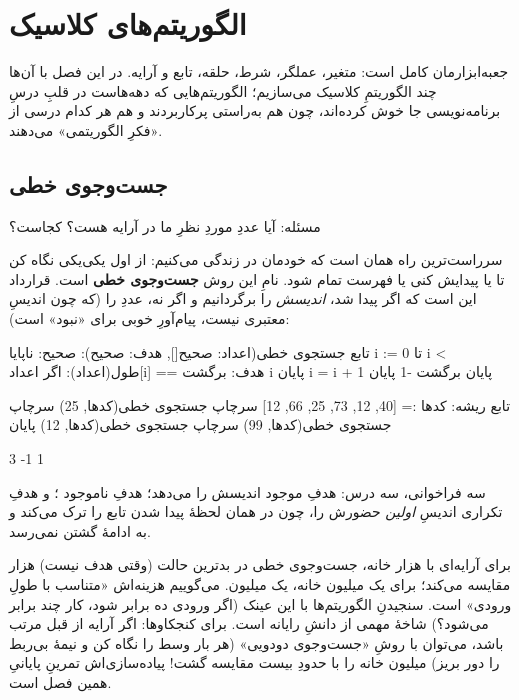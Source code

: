 \chapter{الگوریتم‌های کلاسیک}%
\label{ch:classic-algorithms}

جعبه‌ابزارمان کامل است: متغیر، عملگر، شرط، حلقه، تابع و آرایه. در این فصل
با آن‌ها چند الگوریتمِ کلاسیک می‌سازیم؛ الگوریتم‌هایی که دهه‌هاست در قلبِ
درسِ برنامه‌نویسی جا خوش کرده‌اند، چون هم به‌راستی پرکاربردند و هم هر
کدام درسی از «فکرِ الگوریتمی» می‌دهند.

\section{جست‌وجوی خطی}

مسئله: آیا عددِ موردِ نظرِ ما در آرایه هست؟ کجاست؟

سرراست‌ترین راه همان است که خودمان در زندگی می‌کنیم: از اول یکی‌یکی نگاه
کن تا یا پیدایش کنی یا فهرست تمام شود. نامِ این روش \textbf{جست‌وجوی خطی}
است. قرارداد این است که اگر پیدا شد، \emph{اندیسش} را برگردانیم و اگر نه،
عددِ  را (که چون اندیسِ معتبری نیست، پیام‌آورِ خوبی برای «نبود»
است):

\begin{salamfa}
تابع جستجوی خطی(اعداد: صحیح[], هدف: صحیح): صحیح:
    ناپایا i := 0
    تا i < طول(اعداد):
        اگر اعداد[i] == هدف:
            برگشت i
        پایان
        i = i + 1
    پایان
    برگشت -1
پایان

تابع ریشه:
    کدها := [40, 12, 73, 25, 66, 12]
    سرچاپ جستجوی خطی(کدها, 25)
    سرچاپ جستجوی خطی(کدها, 99)
    سرچاپ جستجوی خطی(کدها, 12)
پایان
\end{salamfa}

\begin{progout}
3
-1
1
\end{progout}

سه فراخوانی، سه درس: هدفِ موجود اندیسش را می‌دهد؛ هدفِ ناموجود ؛
و هدفِ تکراری اندیسِ \emph{اولین} حضورش را، چون  در همان
لحظهٔ پیدا شدن تابع را ترک می‌کند و به ادامهٔ گشتن نمی‌رسد.

\begin{deep}
برای آرایه‌ای با هزار خانه، جست‌وجوی خطی در بدترین حالت (وقتی هدف نیست)
هزار مقایسه می‌کند؛ برای یک میلیون خانه، یک میلیون. می‌گوییم هزینه‌اش
«متناسب با طولِ ورودی» است. سنجیدنِ الگوریتم‌ها با این عینک (اگر ورودی ده
برابر شود، کار چند برابر می‌شود؟) شاخهٔ مهمی از دانشِ رایانه است. برای
کنجکاوها: اگر آرایه از قبل مرتب باشد، می‌توان با روشِ «جست‌وجوی دودویی»
(هر بار وسط را نگاه کن و نیمهٔ بی‌ربط را دور بریز) میلیون خانه را با
حدودِ بیست مقایسه گشت! پیاده‌سازی‌اش تمرینِ پایانیِ همین فصل است.
\end{deep}

